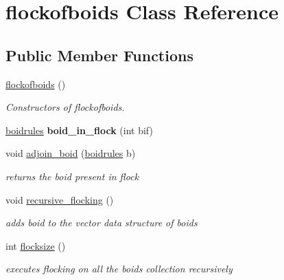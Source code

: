 \hypertarget{classflockofboids}{}\section{flockofboids Class Reference}
\label{classflockofboids}
\subsection*{Public Member Functions}
\begin{DoxyCompactItemize}
\item 
\mbox{\label{classflockofboids_afd6708805d7ac82fcbb1b1d6cdbeed42}} 
\mbox{\hyperlink{classflockofboids_afd6708805d7ac82fcbb1b1d6cdbeed42}{flockofboids}} ()
\begin{DoxyCompactList}\small\item\em Constructors of flockofboids. \end{DoxyCompactList}\item 
\mbox{\label{classflockofboids_a18d0e6225637faad0a72e4a104cf5772}} 
\mbox{\hyperlink{classboidrules}{boidrules}} {\bfseries boid\+\_\+in\+\_\+flock} (int bif)
\item 
\mbox{\label{classflockofboids_af360950e8d143fcec524ff8efda4f5ce}} 
void \mbox{\hyperlink{classflockofboids_af360950e8d143fcec524ff8efda4f5ce}{adjoin\+\_\+boid}} (\mbox{\hyperlink{classboidrules}{boidrules}} b)
\begin{DoxyCompactList}\small\item\em returns the boid present in flock \end{DoxyCompactList}\item 
\mbox{\label{classflockofboids_a1c96e1f0069452958ec58d311b1b6235}} 
void \mbox{\hyperlink{classflockofboids_a1c96e1f0069452958ec58d311b1b6235}{recursive\+\_\+flocking}} ()
\begin{DoxyCompactList}\small\item\em adds boid to the vector data structure of boids \end{DoxyCompactList}\item 
\mbox{\label{classflockofboids_a3bc6c0b7701dedad45c7b33071f642dd}} 
int \mbox{\hyperlink{classflockofboids_a3bc6c0b7701dedad45c7b33071f642dd}{flocksize}} ()
\begin{DoxyCompactList}\small\item\em executes flocking on all the boids collection recursively \end{DoxyCompactList}\end{DoxyCompactItemize}
